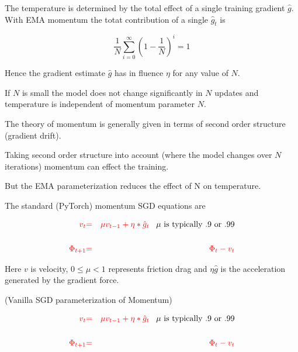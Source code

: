 {

The temperature is determined by the total effect of a single training gradient $\hat{g}$.
With EMA momentum the totat contribution of a single $\hat{g}_t$ is

$$\frac{1}{N} \sum_{i = 0}^\infty \left(1 - \frac{1}{N}\right)^i = 1$$

\vfill
Hence the gradient estimate $\hat{g}$ has in fluence $\eta$ for any value of $N$.

\vfill
If $N$ is small the model does not change significantly in $N$ updates and
temperature is independent of momentum parameter $N$.



The theory of momentum is generally given in terms of second order structure (gradient drift).

\vfill
Taking second order structure into account (where the model changes over $N$ iterations) momentum can effect the training.

\vfill
But the EMA parameterization reduces the effect of N on temperature.


The standard (PyTorch) momentum SGD equations are

\begin{eqnarray*}
  {\color{red} v_t} & {\color{red} =} & {\color{red} \mu v_{t-1} + \eta * \hat{g}_t} \;\;\;\mbox{$\mu$ is typically .9 or .99}\\
  \\
  {\color{red} \Phi_{t+1}} & {\color{red} =} & {\color{red} \Phi_t -  v_t} \\
\end{eqnarray*}

\vfill
Here $v$ is velocity, $0 \leq \mu < 1$ represents friction drag and $\eta \hat{g}$ is the acceleration generated by the gradient force.

{(Vanilla SGD parameterization of Momentum)}

\begin{eqnarray*}
  {\color{red} v_t} & {\color{red} =} & {\color{red} \mu v_{t-1} + \eta * \hat{g}_t} \;\;\;\mbox{$\mu$ is typically .9 or .99}\\
  \\
  {\color{red} \Phi_{t+1}} & {\color{red} =} & {\color{red} \Phi_t -  v_t}
\end{eqnarray*}

}
